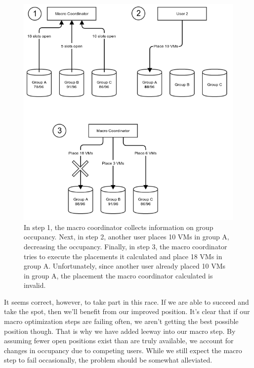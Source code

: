 \documentclass[11pt]{article}
\begin{document}
\begin{figure}
  \centering
\includegraphics[scale=0.65]{macrodelay.png}

 \caption{In step 1, the macro coordinator collects information on group occupancy.  Next, in step 2, another user places 10 VMs in group A, decreasing the occupancy.  Finally, in step 3, the macro coordinator tries to execute the placements it calculated and place 18 VMs in group A.  Unfortunately, since another user already placed 10 VMs in group A, the placement the macro coordinator calculated is invalid.}

 \label{fig:macrodelay}
 
\end{figure}

It seems correct, however, to take part in this race. If we are able to succeed and take the spot, then we'll benefit from our improved position.  It's clear that if our macro optimization steps are failing often, we aren't getting the best possible position though.  That is why we have added leeway into our macro step.  By assuming fewer open positions exist than are truly available, we account for changes in occupancy due to competing users. While we still expect the macro step to fail occasionally, the problem should be somewhat alleviated. 
\end{document}
